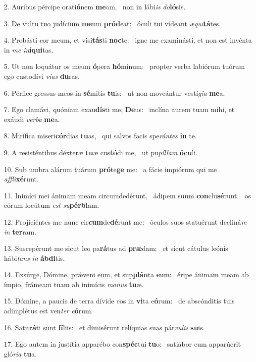 2. Auribus pércipe orati\textbf{ó}nem \textbf{me}am, \ast\  non in lábi\textit{is} \textit{do}\textbf{ló}sis.\

3. De vultu tuo judícium \textbf{me}um \textbf{pród}eat: \ast\  óculi tui vídeant \textit{æ}\textit{qui}\textbf{tá}tes.\

4. Probásti cor meum, et visi\textbf{tás}ti \textbf{noc}te: \ast\  igne me examinásti, et non est invénta in \textit{me} \textit{in}\textbf{í}\textbf{qui}tas.\

5. Ut non loquátur os meum \textbf{ó}pera \textbf{hó}minum: \ast\  propter verba labiórum tuórum ego custodívi \textit{vi}\textit{as} \textbf{du}ras.\

6. Pérfice gressus meos in \textbf{sé}mitis \textbf{tu}is: \ast\  ut non moveántur vestí\textit{gi}\textit{a} \textbf{me}a.\

7. Ego clamávi, quóniam exau\textbf{dís}ti me, \textbf{De}us: \ast\  inclína aurem tuam mihi, et exáudi \textit{ver}\textit{ba} \textbf{me}a.\

8. Mirífica miseri\textbf{cór}dias \textbf{tu}as, \ast\  qui salvos facis spe\textit{rán}\textit{tes} \textbf{in} te.\

9. A resisténtibus déxteræ \textbf{tu}æ cus\textbf{tó}di me, \ast\  ut pu\textit{píl}\textit{lam} \textbf{ó}\textbf{cu}li.\

10. Sub umbra alárum tuárum \textbf{pró}te\textbf{ge} me: \ast\  a fácie impiórum qui me \textit{af}\textit{fli}\textbf{xé}runt.\

11. Inimíci mei ánimam meam circumdedérunt, \dag\  ádipem suum \textbf{con}clu\textbf{sé}runt: \ast\  os eórum locútum \textit{est} \textit{su}\textbf{pér}\textbf{bi}am.\

12. Projiciéntes me nunc cir\textbf{cum}de\textbf{dé}runt me: \ast\  óculos suos statuérunt decliná\textit{re} \textit{in} \textbf{ter}ram.\

13. Suscepérunt me sicut leo pa\textbf{rá}tus ad \textbf{præ}dam: \ast\  et sicut cátulus leónis hábi\textit{tans} \textit{in} \textbf{áb}\textbf{di}tis.\

14. Exsúrge, Dómine, prǽveni eum, et sup\textbf{plán}ta \textbf{e}um: \ast\  éripe ánimam meam ab ímpio, frámeam tuam ab inimícis \textit{ma}\textit{nus} \textbf{tu}æ.\

15. Dómine, a paucis de terra dívide eos in \textbf{vi}ta e\textbf{ó}rum: \ast\  de abscónditis tuis adimplétus est ven\textit{ter} \textit{e}\textbf{ó}rum.\

16. Satu\textbf{rá}ti sunt \textbf{fí}liis: \ast\  et dimisérunt relíquias suas pár\textit{vu}\textit{lis} \textbf{su}is.\

17. Ego autem in justítia apparébo con\textbf{spéc}tui \textbf{tu}o: \ast\  satiábor cum apparúerit gló\textit{ri}\textit{a} \textbf{tu}a.\

